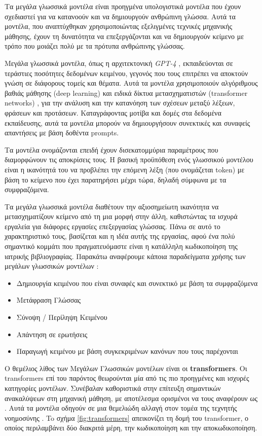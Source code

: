 \documentclass[10pt,leqno]{amsart}
\begin{document}
Τα μεγάλα γλωσσικά μοντέλα \cite{zhao2023survey} είναι προηγμένα υπολογιστικά μοντέλα που έχουν σχεδιαστεί για να κατανοούν και να δημιουργούν ανθρώπινη γλώσσα. Αυτά τα μοντέλα, που αναπτύχθηκαν χρησιμοποιώντας εξελιγμένες τεχνικές μηχανικής μάθησης, έχουν τη δυνατότητα να επεξεργάζονται και να δημιουργούν κείμενο με τρόπο που μοιάζει πολύ με τα πρότυπα ανθρώπινης γλώσσας.

Μεγάλα γλωσσικά μοντέλα, όπως η αρχιτεκτονική \textit{GPT-4} \cite{openai2023gpt4}, εκπαιδεύονται σε τεράστιες ποσότητες δεδομένων κειμένου, γεγονός που τους επιτρέπει να αποκτούν γνώση σε διάφορους τομείς και θέματα. Αυτά τα μοντέλα χρησιμοποιούν αλγόριθμους βαθιάς μάθησης (deep learning) \cite{Sarker2021} και ειδικά δίκτυα μετασχηματιστών (transformer networks) \cite{Dosovitskiy2020}, για την ανάλυση και την κατανόηση των σχέσεων μεταξύ λέξεων, φράσεων και προτάσεων. Καταγράφοντας μοτίβα και δομές στα δεδομένα εκπαίδευσης, αυτά τα μοντέλα μπορούν να δημιουργήσουν συνεκτικές και συναφείς
απαντήσεις με βάση δοθέντα prompts.

Tα μοντέλα ονομάζονται  επειδή έχουν δισεκατομμύρια παραμέτρους που διαμορφώνουν τις αποκρίσεις τους. Η βασική προϋπόθεση ενός γλωσσικού μοντέλου είναι η ικανότητά του να προβλέπει την επόμενη λέξη (που ονομάζεται token) με βάση το κείμενο που έχει παρατηρήσει μέχρι τώρα, δηλαδή σύμφωνα με τα συμφραζόμενα.


Τα μεγάλα γλωσσικά μοντέλα διαθέτουν την αξιοσημείωτη ικανότητα να μετασχηματίζουν κείμενο από τη μια μορφή στην άλλη, καθιστώντας τα ισχυρά εργαλεία για διάφορες εργασίες επεξεργασίας γλώσσας. 
Πάνω σε αυτό το χαρακτηριστικό τους, βασίζεται και η ιδέα αυτής της εργασίας, αφού ένα πολύ σημαντικό κομμάτι που πραγματευόμαστε είναι η κατάλληλη κωδικοποίηση της ιατρικής βιβλιογραφίας.
Παρακάτω αναφέρουμε κάποια παραδείγματα χρήσης των μεγάλων γλωσσικών μοντέλων \cite{Paranjape2023}: 

\begin{itemize}
    \item Δημιουργία κειμένου που είναι συναφές και συνεκτικό με βάση τα συμφραζόμενα
    \item Μετάφραση Γλώσσας
    \item Σύνοψη / Περίληψη Κειμένου
    \item  Απάντηση σε ερωτήσεις
    \item Παραγωγή κειμένου με βάση συγκεκριμένων κανόνων που τους παρέχονται
\end{itemize}

Ο θεμέλιος λίθος των Μεγάλων Γλωσσικών μοντέλων είναι οι \textbf{transformers}.
Οι transformers \cite{Vaswani2017} επί του παρόντος θεωρούνται μία από τις πιο προηγμένες και ισχυρές κατηγορίες μοντέλων. Συνέβαλαν καθοριστικά στην επίτευξη σημαντικών ανακαλύψεων στη μηχανική μάθηση, με αποτέλεσμα ορισμένοι να τους αναφέρουν ως . Aυτά τα μοντέλα οδηγούν σε μια θεμελιώδη αλλαγή στον τομέα της τεχνητής νοημοσύνης \cite{Bommasani2021}.
To σχήμα \ref{fig:transformers} απεικονίζει τη δομή του transformer, ο οποίος περιλαμβάνει δύο διακριτά μέρη, την κωδικοποίηση και την αποκωδικοποίηση.
\end{document}
